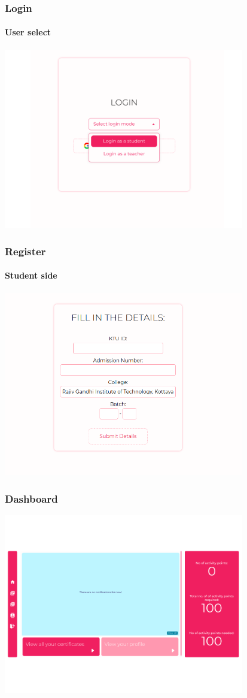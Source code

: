 \begin{frame}
  \frametitle{Login }
    \framesubtitle{User select}
\centering
{\includegraphics[width=10.5cm]{login2.png}}
\end{frame}


\begin{frame}
  \frametitle{Register }
    \framesubtitle{Student side}
\centering
{\includegraphics[width=10.5cm]{register.png}}
\end{frame}


\begin{frame}
  \frametitle{Dashboard }
   
\centering
{\includegraphics[width=10.5cm]{dashboard.png}}
\end{frame}


